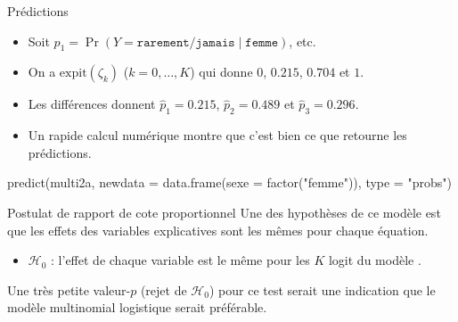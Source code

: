 \documentclass[
  ignorenonframetext,
]{beamer}
\newenvironment{Shaded}{\begin{snugshade}}{\end{snugshade}}
\newcommand{\AttributeTok}[1]{\textcolor[rgb]{0.40,0.45,0.13}{#1}}
\newcommand{\FunctionTok}[1]{\textcolor[rgb]{0.28,0.35,0.67}{#1}}
\newcommand{\NormalTok}[1]{\textcolor[rgb]{0.00,0.23,0.31}{#1}}
\newcommand{\StringTok}[1]{\textcolor[rgb]{0.13,0.47,0.30}{#1}}
\providecommand{\tightlist}{%
  \setlength{\itemsep}{0pt}\setlength{\parskip}{0pt}}\usepackage{longtable,booktabs,array}
\begin{document}
\begin{frame}[fragile]{Prédictions}
\protect\hypertarget{pruxe9dictions-1}{}
\begin{itemize}
\tightlist
\item
  Soit \(p_1 = \Pr(Y = \texttt{rarement/jamais} \mid \texttt{femme})\),
  etc.
\item
  On a \(\mathrm{expit}(\zeta_k)\) (\(k=0, \ldots, K\)) qui donne \(0\),
  \(0.215\), \(0.704\) et \(1\).
\item
  Les différences donnent \(\widehat{p}_1 = 0.215\),
  \(\widehat{p}_2 = 0.489\) et \(\widehat{p}_3 = 0.296\).
\item
  Un rapide calcul numérique montre que c'est bien ce que retourne les
  prédictions.
\end{itemize}

\begin{Shaded}
\begin{Highlighting}[numbers=left,,]
\FunctionTok{predict}\NormalTok{(multi2a, }
        \AttributeTok{newdata =} \FunctionTok{data.frame}\NormalTok{(}\AttributeTok{sexe =} \FunctionTok{factor}\NormalTok{(}\StringTok{"femme"}\NormalTok{)), }
        \AttributeTok{type =} \StringTok{"probs"}\NormalTok{)}
\end{Highlighting}
\end{Shaded}
\end{frame}

\begin{frame}{Postulat de rapport de cote proportionnel}
\protect\hypertarget{postulat-de-rapport-de-cote-proportionnel}{}
Une des hypothèses de ce modèle est que les effets des variables
explicatives sont les mêmes pour chaque équation.

\begin{itemize}
\tightlist
\item
  \(\mathscr{H}_0\) : l'effet de chaque variable est le même pour les
  \(K\) logit du modèle .
\end{itemize}

Une très petite valeur-\(p\) (rejet de \(\mathscr{H}_0\)) pour ce test
serait une indication que le modèle multinomial logistique serait
préférable.
\end{frame}
\end{document}
